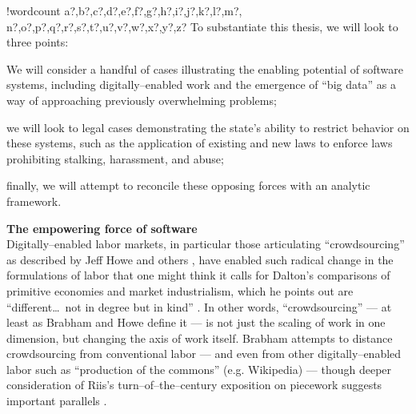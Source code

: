 \documentclass[11pt]{article}
\newcounter{words}
\newenvironment{counted}{%
  \setcounter{words}{0}
  \SearchList!{wordcount}{\stepcounter{words}}
    {a?,b?,c?,d?,e?,f?,g?,h?,i?,j?,k?,l?,m?,
    n?,o?,p?,q?,r?,s?,t?,u?,v?,w?,x?,y?,z?}
  \UndoBoundary{'}
  \SearchOrder{p;}}{%
  \StopSearching}
\newcommand{\sectitle}[1]{\textbf{#1}\\}
\begin{document}
\begin{counted}
To substantiate this thesis,
we will look to three points:
\begin{inlinelist}
\item We will consider a handful of cases illustrating the enabling potential of software systems, including digitally--enabled work and the emergence of ``big data'' as a way of approaching previously overwhelming problems;
\item we will look to legal cases demonstrating the state's ability to restrict behavior on these systems, such as the application of existing and new laws to enforce laws prohibiting stalking, harassment, and abuse;
\item finally, we will attempt to reconcile these opposing forces with an analytic framework.
\end{inlinelist}

\sectitle{The empowering force of software}
Digitally--enabled labor markets,
in particular those articulating ``crowdsourcing'' as described by Jeff Howe and others
\cite{brabham2013crowdsourcing,howe2008crowdsourcing},
have enabled such radical change in the formulations of labor that one might think it calls for Dalton's comparisons of primitive economies and market industrialism, which he points out are
``different\dots\ not in degree but in kind''
\cite{dalton1961economic}.
In other words, ``crowdsourcing''
--- at least as Brabham and Howe define it ---
is not just the scaling of work in one dimension, but changing the axis of work itself.
Brabham attempts to distance crowdsourcing from conventional labor
--- and even from other digitally--enabled labor such as ``production of the commons'' (e.g. Wikipedia) ---
though deeper consideration of Riis's turn--of--the--century exposition on piecework suggests important parallels 
\cite{brabham2013crowdsourcing,riisOtherSideLives}.


\end{counted}
\end{document}
